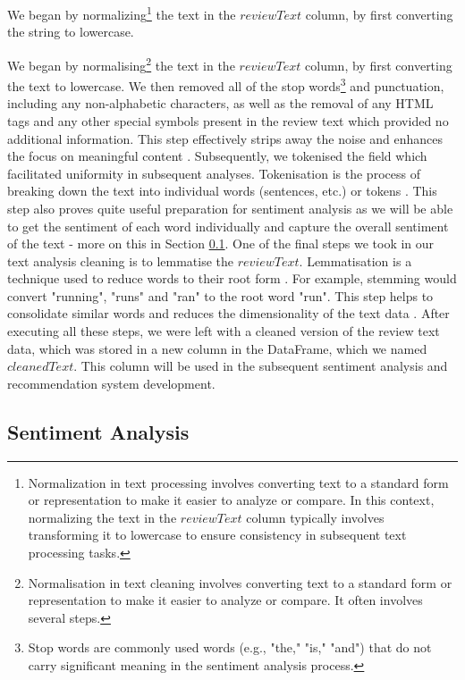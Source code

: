 We began by normalizing\footnote{Normalization in text processing involves converting text to a standard form or representation to make it easier to analyze or compare. In this context, normalizing the text in the $reviewText$ column typically involves transforming it to lowercase to ensure consistency in subsequent text processing tasks.} the text in the $reviewText$ column, by first converting the string to lowercase.

We began by normalising\footnote{Normalisation in text cleaning involves converting text to a standard form or representation to make it easier to analyze or compare. It often involves several steps.} the text in the $reviewText$ column, by first converting the text to lowercase. We then removed all of the stop words\footnote{Stop words are commonly used words (e.g., "the," "is," "and") that do not carry significant meaning in the sentiment analysis process.} and punctuation, including any non-alphabetic characters, as well as the removal of any HTML tags and any other special symbols present in the review text which provided no additional information. This step effectively strips away the noise and enhances the focus on meaningful content \cite{saravanan2003summarization}. Subsequently, we tokenised the field which facilitated uniformity in subsequent analyses. Tokenisation is the process of breaking down the text into individual words (sentences, etc.) or tokens \cite{saravanan2003summarization}. This step also proves quite useful preparation for sentiment analysis as we will be able to get the sentiment of each word individually and capture the overall sentiment of the text - more on this in Section \ref{subsec:3 Sentiment Analysis}. One of the final steps we took in our text analysis cleaning is to lemmatise the $reviewText$. Lemmatisation is a technique used to reduce words to their root form \cite{saravanan2003summarization}. For example, stemming would convert "running", "runs" and "ran" to the root word "run". This step helps to consolidate similar words and reduces the dimensionality of the text data \cite{gharatkar2017review}. After executing all these steps, we were left with a cleaned version of the review text data, which was  stored in a new column in the DataFrame, which we named $cleanedText$. This column will be used in the subsequent sentiment analysis and recommendation system development.


\subsection{Sentiment Analysis}
\label{subsec:3 Sentiment Analysis}

